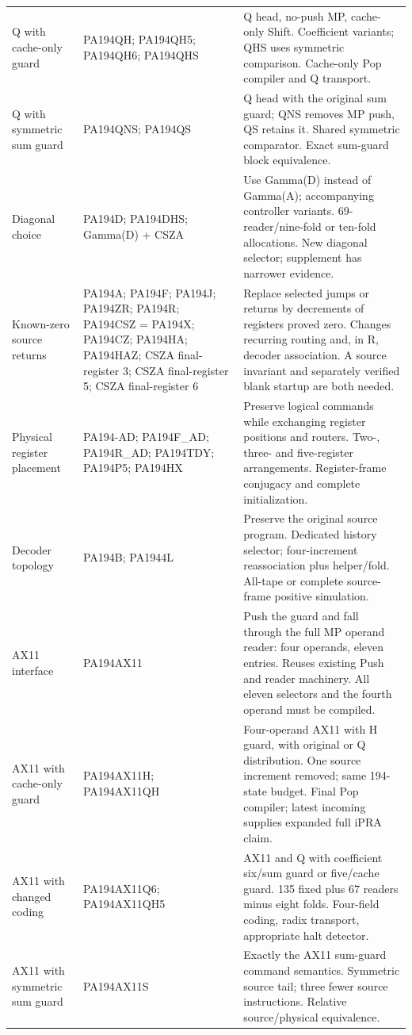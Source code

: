 \begin{longtable}{L{30mm}L{43mm}L{72mm}}
Q with cache-only guard & PA194QH; PA194QH5; PA194QH6; PA194QHS & Q head, no-push MP, cache-only Shift. Coefficient variants; QHS uses symmetric comparison. Cache-only Pop compiler and Q transport.\\[4pt]
Q with symmetric sum guard & PA194QNS; PA194QS & Q head with the original sum guard; QNS removes MP push, QS retains it. Shared symmetric comparator. Exact sum-guard block equivalence.\\[4pt]
Diagonal choice & PA194D; PA194DHS; Gamma(D) + CSZA & Use Gamma(D) instead of Gamma(A); accompanying controller variants. 69-reader/nine-fold or ten-fold allocations. New diagonal selector; supplement has narrower evidence.\\[4pt]
Known-zero source returns & PA194A; PA194F; PA194J; PA194ZR; PA194R; PA194CSZ = PA194X; PA194CZ; PA194HA; PA194HAZ; CSZA final-register 3; CSZA final-register 5; CSZA final-register 6 & Replace selected jumps or returns by decrements of registers proved zero. Changes recurring routing and, in R, decoder association. A source invariant and separately verified blank startup are both needed.\\[4pt]
Physical register placement & PA194-AD; PA194F\_AD; PA194R\_AD; PA194TDY; PA194P5; PA194HX & Preserve logical commands while exchanging register positions and routers. Two-, three- and five-register arrangements. Register-frame conjugacy and complete initialization.\\[4pt]
Decoder topology & PA194B; PA1944L & Preserve the original source program. Dedicated history selector; four-increment reassociation plus helper/fold. All-tape or complete source-frame positive simulation.\\[4pt]
AX11 interface & PA194AX11 & Push the guard and fall through the full MP operand reader: four operands, eleven entries. Reuses existing Push and reader machinery. All eleven selectors and the fourth operand must be compiled.\\[4pt]
AX11 with cache-only guard & PA194AX11H; PA194AX11QH & Four-operand AX11 with H guard, with original or Q distribution. One source increment removed; same 194-state budget. Final Pop compiler; latest incoming supplies expanded full iPRA claim.\\[4pt]
AX11 with changed coding & PA194AX11Q6; PA194AX11QH5 & AX11 and Q with coefficient six/sum guard or five/cache guard. 135 fixed plus 67 readers minus eight folds. Four-field coding, radix transport, appropriate halt detector.\\[4pt]
AX11 with symmetric sum guard & PA194AX11S & Exactly the AX11 sum-guard command semantics. Symmetric source tail; three fewer source instructions. Relative source/physical equivalence.\\[4pt]

\end{longtable}
